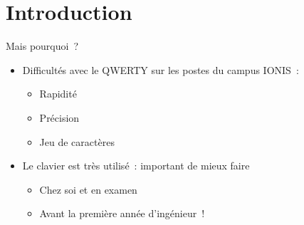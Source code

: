 \section{Introduction}

\begin{frame}{Mais pourquoi~?}
  \begin{itemize}
    \item Difficultés avec le QWERTY sur les postes du campus IONIS~: \pause
      \begin{itemize}
        \item Rapidité \pause
        \item Précision \pause
        \item Jeu de caractères \pause
      \end{itemize}
    \item Le clavier est très utilisé~: important de mieux faire \pause
      \begin{itemize}
        \item Chez soi et en examen \pause
        \item Avant la première année d’ingénieur~!
      \end{itemize}
  \end{itemize}
\end{frame}
